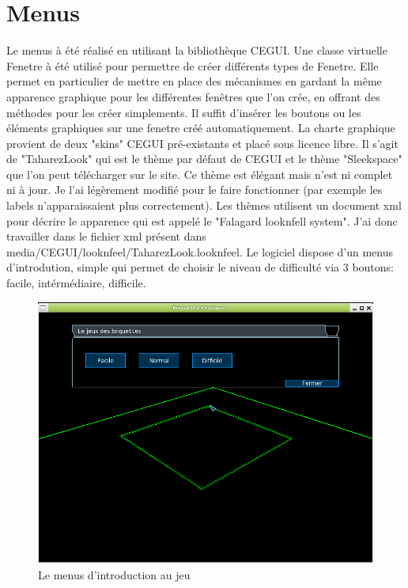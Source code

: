 \documentclass[frenchb,twoside]{EPURapport}
\begin{document}
    \section{Menus}
        Le menus à été réalisé en utilisant la bibliothèque CEGUI. Une classe
        virtuelle Fenetre à été utilisé pour permettre de créer différents
        types de Fenetre. Elle permet en particulier de mettre en place des
        mécanismes en gardant la même apparence graphique pour les différentes
        fenêtres que l'on crée, en offrant des méthodes pour les créer
        simplements. Il suffit d'insérer les boutons ou les éléments graphiques
        sur une fenetre créé automatiquement.
        La charte graphique provient de deux "skins" CEGUI pré-existants et
        placé sous licence libre. Il s'agit de "TaharezLook" qui est le thème
        par défaut de CEGUI et le thème "Sleekspace" que l'on peut télécharger
        sur le site. Ce thème est élégant mais n'est ni complet ni à jour. Je
        l'ai légèrement modifié pour le faire fonctionner (par exemple les
        labels n'apparaissaient plus correctement). Les thèmes utilisent un
        document xml pour décrire le apparence qui est appelé le "Falagard
        looknfell system". J'ai donc travailler dans le fichier xml présent
        dans media/CEGUI/looknfeel/TaharezLook.looknfeel.
        Le logiciel dispose d'un menus d'introdution, simple qui permet de
        choisir le niveau de difficulté via 3 boutons: facile, intérmédiaire,
        difficile.
		\begin{figure}[h]
			\centering
			\includegraphics[scale=0.75]{images/Menus_initial.png}
			\caption{\label{fig:menus_initial}Le menus d'introduction au jeu}
		\end{figure}
\end{document}
